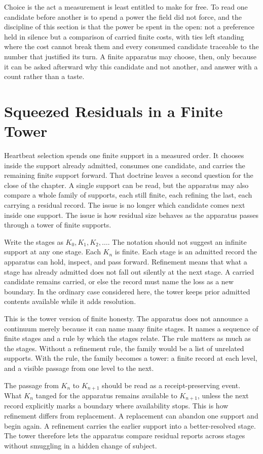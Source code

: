 Choice is the act a measurement is least entitled to make for free. To read one candidate before another is to spend a power the field did not force, and the discipline of this section is that the power be spent in the open: not a preference held in silence but a comparison of carried finite costs, with ties left standing where the cost cannot break them and every consumed candidate traceable to the number that justified its turn. A finite apparatus may choose, then, only because it can be asked afterward why this candidate and not another, and answer with a count rather than a taste.

\section{Squeezed Residuals in a Finite Tower}

Heartbeat selection spends one finite support in a measured order. It chooses
inside the support already admitted, consumes one candidate, and carries the
remaining finite support forward. That doctrine leaves a second question for
the close of the chapter. A single support can be read, but the apparatus may
also compare a whole family of supports, each still finite, each refining the
last, each carrying a residual record. The issue is no longer which candidate
comes next inside one support. The issue is how residual size behaves as the
apparatus passes through a tower of finite supports.

Write the stages as \(K_0,K_1,K_2,\ldots\). The notation should not suggest an
infinite support at any one stage. Each \(K_n\) is finite. Each stage is an
admitted record the apparatus can hold, inspect, and pass forward. Refinement
means that what a stage has already admitted does not fall out silently at the
next stage. A carried candidate remains carried, or else the record must name
the loss as a new boundary. In the ordinary case considered here, the tower
keeps prior admitted contents available while it adds resolution.

This is the tower version of finite honesty. The apparatus does not announce a
continuum merely because it can name many finite stages. It names a sequence
of finite stages and a rule by which the stages relate. The rule matters as
much as the stages. Without a refinement rule, the family would be a list of
unrelated supports. With the rule, the family becomes a tower: a finite record
at each level, and a visible passage from one level to the next.

The passage from \(K_n\) to \(K_{n+1}\) should be read as a receipt-preserving
event. What \(K_n\) tanged for the apparatus remains available to
\(K_{n+1}\), unless the next record explicitly marks a boundary where
availability stops. This is how refinement differs from replacement. A
replacement can abandon one support and begin again. A refinement carries the
earlier support into a better-resolved stage. The tower therefore lets the
apparatus compare residual reports across stages without smuggling in a hidden
change of subject.

